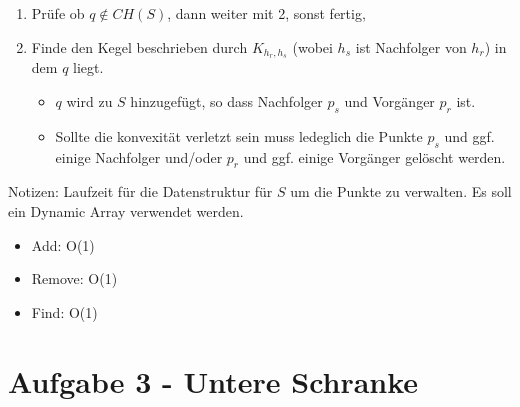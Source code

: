 \documentclass[a4paper]{article}
\begin{document}
\begin{enumerate}

\item Prüfe ob $q \notin CH(S)$, dann weiter mit 2, sonst fertig,

\item Finde den Kegel beschrieben durch $K_{h_r,h_s}$ (wobei $h_s$ ist Nachfolger von $h_r$) in dem $q$ liegt.

\begin{itemize}
	\item $q$ wird zu $S$ hinzugefügt, so dass Nachfolger $p_s$ und Vorgänger $p_r$ ist.
	
	\item Sollte die konvexität verletzt sein muss ledeglich die Punkte $p_s$ und ggf. einige Nachfolger und/oder $p_r$ und ggf. einige Vorgänger gelöscht werden.
\end{itemize}

\end{enumerate}

Notizen:
Laufzeit für die Datenstruktur für $S$ um die Punkte zu verwalten.
Es soll ein Dynamic Array verwendet werden.
\begin{itemize}
 \item Add: O(1)
 \item Remove: O(1)
 \item Find: O(1)
 
\end{itemize}

\section*{Aufgabe 3 - Untere Schranke}
\end{document}
